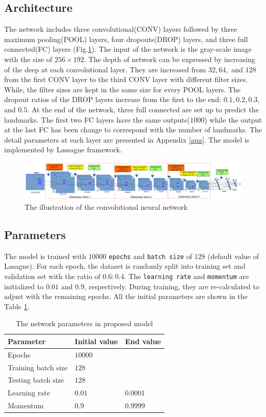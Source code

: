 \documentclass[12pt,a4paper]{article}
\begin{document}
\subsection{Architecture}
The network includes three convolutional(CONV) layers followed by three maximum pooling(POOL) layers, four dropouts(DROP) layers, and three full connected(FC) layers (Fig.\ref{pmodel}). The input of the network is the gray-scale image with the size of $256 \times 192$. The depth of network can be expressed by increasing of the deep at each convolutional layer. They are increased from $32, 64,$ and $128$ from the first CONV layer to the third CONV layer with different filter sizes. While, the filter sizes are kept in the same size for every POOL layers. The dropout ratios of the DROP layers increase from the first to the end: $0.1, 0.2, 0.3, $ and $0.5$. At the end of the network, three full connected are set up to predict the landmarks. The first two FC layers have the same outputs($1000$) while the output at the last FC has been change to correspond with the number of landmarks. The detail parameters at each layer are presented in Appendix \ref{apa}. The model is implemented by Lassagne framework\cite{lasagne}.
\begin{figure}[h!]
	\centering
	\includegraphics[scale=0.3]{images/fine_tuning/arch_model}
	\caption{The illustration of the convolutional neural network}
	\label{pmodel}
\end{figure}
\subsection{Parameters}
The model is trained with $10000$ \texttt{epochs} and \texttt{batch size} of $128$ (default value of Lasagne). For each epoch, the dataset is randomly split into training set and validation set with the ratio of $0.6:0.4$. The \texttt{learning rate} and \texttt{momentum} are initialized to $0.01$ and $0.9$, respectively. During training, they are re-calculated to adjust with the remaining epochs. All the initial parameters are shown in the Table \ref{initparameters}.
\begin{table}[h!]
	\centering
	\begin{tabular}{l l l}
	Parameter & Initial value & End value \\ \hline
	Epochs & $10000$ &  \\ \hline
	Training batch size & $128$ & \\ \hline
	Testing batch size & $128$ & \\ \hline
	Learning rate & $0.01$ & $0.0001$ \\ \hline
	Momentum & $0.9$ & $0.9999$ \\ \hline
	\end{tabular}
	\caption{The network parameters in proposed model}
	\label{initparameters}
\end{table}
\end{document}
